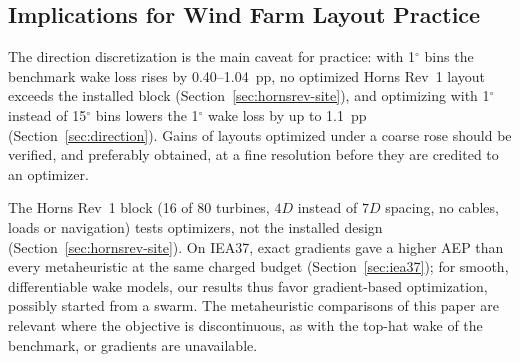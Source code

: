 \subsection{Implications for Wind Farm Layout Practice}
\label{sec:disc-practice}
The direction discretization is the main caveat for practice: with 1$^\circ$ bins the benchmark wake loss rises by 0.40--1.04~pp, no optimized Horns Rev~1 layout exceeds the installed block (Section~\ref{sec:hornsrev-site}), and optimizing with 1$^\circ$ instead of 15$^\circ$ bins lowers the 1$^\circ$ wake loss by up to 1.1~pp (Section~\ref{sec:direction}). Gains of layouts optimized under a coarse rose should be verified, and preferably obtained, at a fine resolution before they are credited to an optimizer.

The Horns Rev~1 block (16 of 80 turbines, $4D$ instead of $7D$ spacing, no cables, loads or navigation) tests optimizers, not the installed design (Section~\ref{sec:hornsrev-site}). On IEA37, exact gradients gave a higher AEP than every metaheuristic at the same charged budget (Section~\ref{sec:iea37}); for smooth, differentiable wake models, our results thus favor gradient-based optimization, possibly started from a swarm. The metaheuristic comparisons of this paper are relevant where the objective is discontinuous, as with the top-hat wake of the benchmark, or gradients are unavailable.

